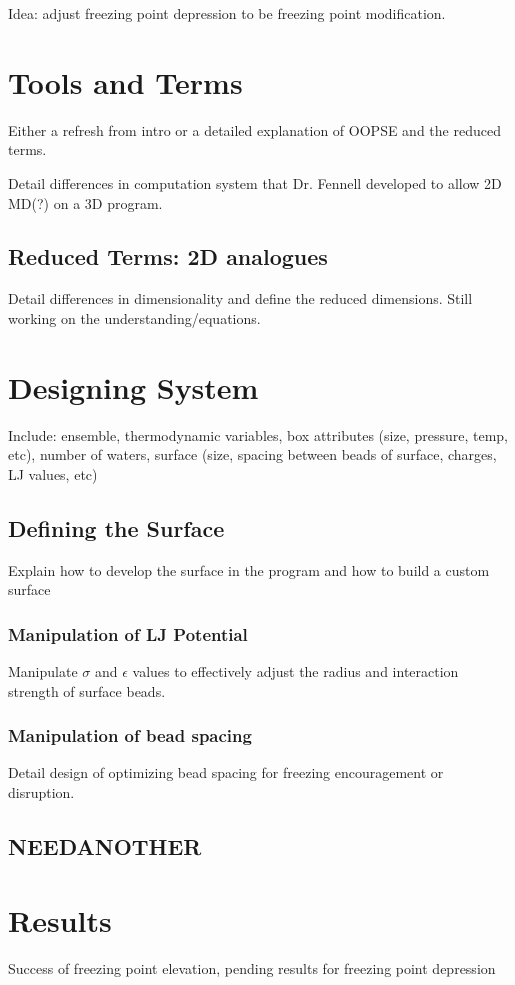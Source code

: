 Idea: adjust freezing point depression to be freezing point modification.

\section{Tools and Terms}

Either a refresh from intro or a detailed explanation of OOPSE and the reduced terms.

Detail differences in computation system that Dr. Fennell developed to allow 2D MD(?) on a 3D program.

\subsection{Reduced Terms: 2D analogues}

Detail differences in dimensionality and define the reduced dimensions. Still working on the understanding/equations.

\section{Designing System}

Include: 
ensemble, 
thermodynamic variables, 
box attributes (size, pressure, temp, etc), 
number of waters,
surface (size, spacing between beads of surface, charges, LJ values, etc)

\subsection{Defining the Surface}

Explain how to develop the surface in the program and how to build a custom surface 

\subsubsection{Manipulation of LJ Potential}

Manipulate $\sigma$ and $\epsilon$ values to effectively adjust the radius and interaction strength of surface beads.

\subsubsection{Manipulation of bead spacing}

Detail design of optimizing bead spacing for freezing encouragement or disruption.

\subsection{NEEDANOTHER}



\section{Results}

Success of freezing point elevation, pending results for freezing point depression



